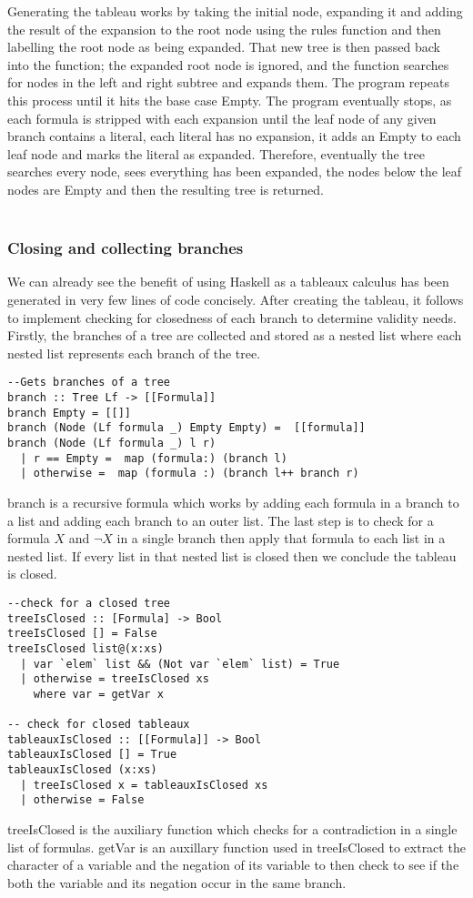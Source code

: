 \documentclass{article}%
\begin{document}
Generating the tableau works by taking the initial node, expanding it and adding the result of the expansion to the root node using the rules function and then labelling the root node as being expanded. That new tree is then passed back into the function; the expanded root node is ignored, and the function searches for nodes in the left and right subtree and expands them. The program repeats this process until it hits the base case Empty. The program eventually stops, as each formula is stripped with each expansion until the leaf node of any given branch contains a literal, each literal has no expansion, it adds an Empty to each leaf node and marks the literal as expanded. Therefore, eventually the tree searches every node, sees everything has been expanded, the nodes below the leaf nodes are Empty and then the resulting tree is returned. \\\\
\subsubsection{Closing and collecting branches} 
We can already see the benefit of using Haskell as a tableaux calculus has been generated in very few lines of code concisely. After creating the tableau, it follows to implement checking for closedness of each branch to determine validity needs. Firstly, the branches of a tree are collected and stored as a nested list where each nested list represents each branch of the tree. 
\begin{verbatim}
--Gets branches of a tree
branch :: Tree Lf -> [[Formula]]
branch Empty = [[]]
branch (Node (Lf formula _) Empty Empty) =  [[formula]]
branch (Node (Lf formula _) l r) 
  | r == Empty =  map (formula:) (branch l)
  | otherwise =  map (formula :) (branch l++ branch r)
\end{verbatim}
branch is a recursive formula which works by adding each formula in a branch to a list and adding each branch to an outer list. 
The last step is to check for a formula $X$ and $\neg{X}$ in a single branch then apply that formula to each list in a nested list. If every list in that nested list is closed then we conclude the tableau is closed.
\begin{verbatim}
--check for a closed tree 
treeIsClosed :: [Formula] -> Bool 
treeIsClosed [] = False 
treeIsClosed list@(x:xs)
  | var `elem` list && (Not var `elem` list) = True
  | otherwise = treeIsClosed xs
    where var = getVar x 

-- check for closed tableaux
tableauxIsClosed :: [[Formula]] -> Bool 
tableauxIsClosed [] = True 
tableauxIsClosed (x:xs) 
  | treeIsClosed x = tableauxIsClosed xs 
  | otherwise = False
\end{verbatim}
treeIsClosed is the auxiliary function which checks for a contradiction in a single list of formulas. getVar is an auxillary function used in treeIsClosed to extract the character of a variable and the negation of its variable to then check to see if the both the variable and its negation occur in the same branch. 
\end{document}
